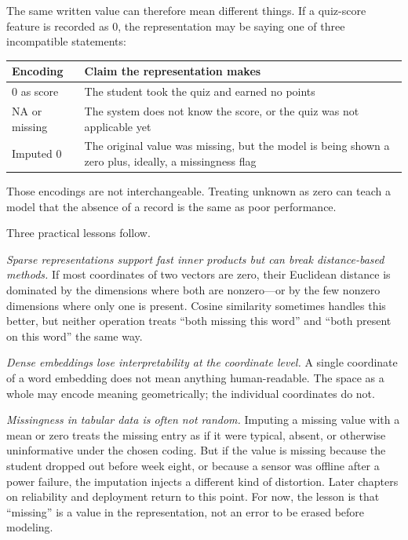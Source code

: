 The same written value can therefore mean different things. If a quiz-score feature is recorded as \(0\), the representation may be saying one of three incompatible statements:

\begin{center}
\small
\begin{tabular}{p{2.1cm}p{6.9cm}}
\toprule
Encoding & Claim the representation makes \\
\midrule
\(0\) as score & The student took the quiz and earned no points \\
\(\mathrm{NA}\) or missing & The system does not know the score, or the quiz was not applicable yet \\
Imputed \(0\) & The original value was missing, but the model is being shown a zero plus, ideally, a missingness flag \\
\bottomrule
\end{tabular}
\end{center}

Those encodings are not interchangeable. Treating unknown as zero can teach a model that the absence of a record is the same as poor performance.

Three practical lessons follow.

\emph{Sparse representations support fast inner products but can break distance-based methods.} If most coordinates of two vectors are zero, their Euclidean distance is dominated by the dimensions where both are nonzero---or by the few nonzero dimensions where only one is present. Cosine similarity sometimes handles this better, but neither operation treats ``both missing this word'' and ``both present on this word'' the same way.

\emph{Dense embeddings lose interpretability at the coordinate level.} A single coordinate of a word embedding does not mean anything human-readable. The space as a whole may encode meaning geometrically; the individual coordinates do not.

\emph{Missingness in tabular data is often not random.} Imputing a missing value with a mean or zero treats the missing entry as if it were typical, absent, or otherwise uninformative under the chosen coding. But if the value is missing because the student dropped out before week eight, or because a sensor was offline after a power failure, the imputation injects a different kind of distortion. Later chapters on reliability and deployment return to this point. For now, the lesson is that ``missing'' is a value in the representation, not an error to be erased before modeling.

